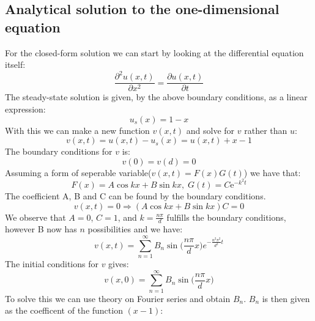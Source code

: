 \documentclass[a4paper,11pt]{article}
\newcommand{\prtl}{\partial} %
\newcommand{\me}{\mathrm{e}} %
\begin{document}
\subsection{Analytical solution to the one-dimensional equation}
    For the closed-form solution we can start by looking at the differential equation itself:
    \begin{equation*}
        \frac{\prtl^2 u(x,t)}{\prtl x^2} = \frac{\prtl u(x,t)}{\prtl t}
    \end{equation*}
    The steady-state solution is given, by the above boundary conditions, as a linear expression:
    \begin{equation*}
        u_s(x) = 1 - x
    \end{equation*}
    With this we can make a new function $v(x,t)$ and solve for $v$ rather than $u$:
    \begin{equation*}
        v(x,t) = u(x,t) - u_s(x) = u(x,t) + x - 1
    \end{equation*}
    The boundary conditions for $v$ is:
    \begin{equation*}
        v(0) = v(d) = 0
    \end{equation*}
    Assuming a form of seperable variable($v(x,t) = F(x)G(t)$) we have that:
    \begin{equation*}
        F(x) = A\cos{kx} + B\sin{kx},\; G(t) = C\me^{-k^2 t}
    \end{equation*}
    The coefficient A, B and C can be found by the boundary conditions.
    \begin{equation*}
        v(x,t) = 0 \Rightarrow (A\cos{kx}+B\sin{kx})C = 0
    \end{equation*}
    We observe that $A=0$, $C=1$, and $k=\frac{n\pi}{d}$ fulfills the boundary conditions, however B now has $n$ possibilities and we have:
    \begin{equation*}
        v(x,t) = \sum_{n=1}^{\infty}B_n\sin{\bigg(\frac{n\pi}{d}x\bigg)}e^{-\frac{n^2\pi^2}{d^2}t}
    \end{equation*}
    The initial conditions for $v$ gives:
    \begin{equation*}
        v(x,0) = \sum_{n=1}^{\infty}B_n\sin{\bigg(\frac{n\pi}{d}x\bigg)}
    \end{equation*}
    To solve this we can use theory on Fourier series and obtain $B_n$. $B_n$ is then given as the coefficent of the function $(x-1)$:
\end{document}

